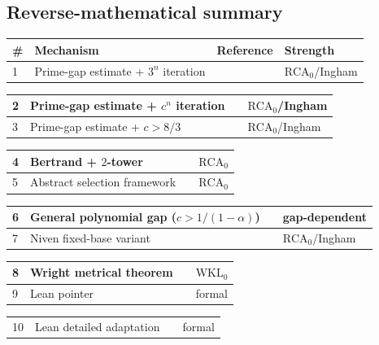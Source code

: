 \documentclass[11pt,reqno]{amsart}
\theoremstyle{blueplain}
\newcounter{asser}
\numberwithin{equation}{section}
\begin{document}
\subsection{Reverse-mathematical summary}

\label{sec:thm-summary}

{\small
\noindent \newline
\noindent
\begin{tabular}{|m{0.6cm}|m{6.4cm}|m{2.4cm}|m{3cm}|}
	\hline
	\textbf{\#} & \textbf{Mechanism} & \textbf{Reference} & \textbf{Strength} \\ \hline
	1 & Prime-gap estimate + $3^n$ iteration & \Cref{asser:mills} & $\mathrm{RCA}_0$/Ingham \\
\end{tabular}%
\noindent \newline
\noindent
\begin{tabular}{|m{0.6cm}|m{6.4cm}|m{2.4cm}|m{3cm}|}
	\hline
	2 & Prime-gap estimate + $c^n$ iteration & \Cref{asser:kuipers} & $\mathrm{RCA}_0$/Ingham \\ \hline
	3 & Prime-gap estimate + $c>8/3$ & \Cref{asser:ansari} & $\mathrm{RCA}_0$/Ingham \\
\end{tabular}%
\noindent \newline
\noindent
\begin{tabular}{|m{0.6cm}|m{6.4cm}|m{2.4cm}|m{3cm}|}
	\hline
	4 & Bertrand + $2$-tower & \Cref{asser:wright} & $\mathrm{RCA}_0$ \\ \hline
	5 & Abstract selection framework & \Cref{asser:ore} & $\mathrm{RCA}_0$ \\
\end{tabular}%
\noindent \newline
\noindent
\begin{tabular}{|m{0.6cm}|m{6.4cm}|m{2.4cm}|m{3cm}|}
	\hline
	6 & General polynomial gap ($c>1/(1-\alpha)$) & \Cref{asser:direct} & gap-dependent \\ \hline
	7 & Niven fixed-base variant & \Cref{asser:niven} & $\mathrm{RCA}_0$/Ingham \\
\end{tabular}%
\noindent \newline
\noindent
\begin{tabular}{|m{0.6cm}|m{6.4cm}|m{2.4cm}|m{3cm}|}
	\hline
	8 & Wright metrical theorem & \Cref{asser:wright-metrical} & $\mathrm{WKL}_0$ \\ \hline
	9 & Lean pointer & \Cref{sec:thm-lean} & formal \\
\end{tabular}%
\noindent \newline
\noindent
\begin{tabular}{|m{0.6cm}|m{6.4cm}|m{2.4cm}|m{3cm}|}
	\hline
	10 & Lean detailed adaptation & \Cref{asser:lean-detailed} & formal \\
\end{tabular}%
}
\end{document}
